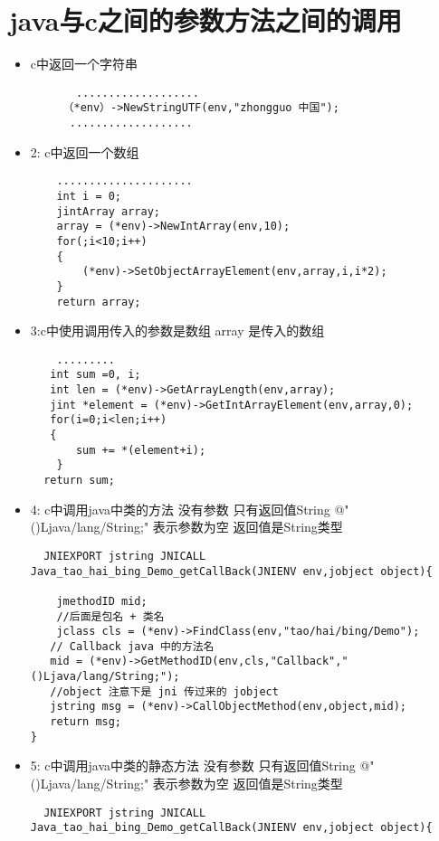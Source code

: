 \documentclass[a4paper,11pt]{book}
\begin{document}
\section{java与c之间的参数方法之间的调用}
\begin{itemize}
    \item c中返回一个字符串
\begin{lstlisting}
       ...................
     （*env）->NewStringUTF(env,"zhongguo 中国");
      ...................
\end{lstlisting}

\item 2: c中返回一个数组
\begin{lstlisting}
    .....................
    int i = 0;
    jintArray array;
    array = (*env)->NewIntArray(env,10);
    for(;i<10;i++)
    {
        (*env)->SetObjectArrayElement(env,array,i,i*2);
    }
    return array;
\end{lstlisting}

\item 3:c中使用调用传入的参数是数组 array 是传入的数组
\begin{lstlisting}
    .........
   int sum =0, i;
   int len = (*env)->GetArrayLength(env,array);
   jint *element = (*env)->GetIntArrayElement(env,array,0);
   for(i=0;i<len;i++)
   {
       sum += *(element+i);
    }
  return sum;
\end{lstlisting}

\item 4: c中调用java中类的方法 没有参数 只有返回值String
    @" ()Ljava/lang/String;" 表示参数为空 返回值是String类型 
\begin{lstlisting}
  JNIEXPORT jstring JNICALL Java_tao_hai_bing_Demo_getCallBack(JNIENV env,jobject object){

    jmethodID mid;
    //后面是包名 + 类名
    jclass cls = (*env)->FindClass(env,"tao/hai/bing/Demo"); 
   // Callback java 中的方法名
   mid = (*env)->GetMethodID(env,cls,"Callback","()Ljava/lang/String;");
   //object 注意下是 jni 传过来的 jobject
   jstring msg = (*env)->CallObjectMethod(env,object,mid); 
   return msg;
}
\end{lstlisting}

\item 5: c中调用java中类的静态方法 没有参数 只有返回值String
    @" ()Ljava/lang/String;" 表示参数为空 返回值是String类型 
\begin{lstlisting}
  JNIEXPORT jstring JNICALL Java_tao_hai_bing_Demo_getCallBack(JNIENV env,jobject object){


\end{lstlisting}
\end{itemize}
\end{document}
